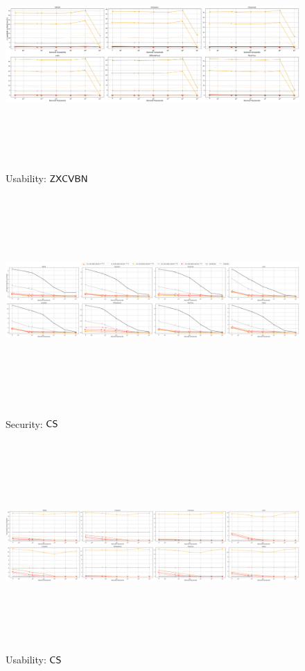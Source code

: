 \begin{figure}
\includegraphics[width=\linewidth, height = 8cm]{Figures/Experiments/Utility/UsabilityZxcvbn}
\vspace{-0.2in}
\caption[Security: $\ZXCVBN$ Estimator]{Usability: $\ZXCVBN$}
\label{fig:usabilityzxcvbn}
	\includegraphics[width=\linewidth, height = 8cm]{Figures/Experiments/Attacker/SecurityPsiCompare}
	\vspace{-0.2in}
	\caption[Security: Selection Optimal $\hitCountThreshold$]{Security: $\mathsf{CS}$}
	\label{fig:securitypsicompare}
	\includegraphics[width=\linewidth, height = 8cm]{Figures/Experiments/Utility/UsabilityPsiCompare}
	\vspace{-0.2in}
	\caption[Usability: Selection Optimal $\hitCountThreshold$]{Usability: $\mathsf{CS}$}
	\label{fig:usabilitypsicompare}


	\end{figure}


